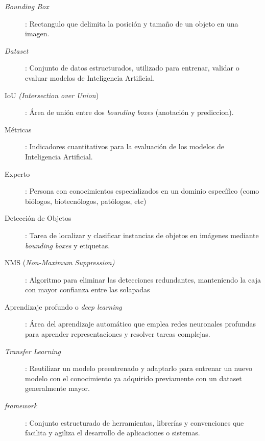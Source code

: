 \documentclass[12pt,a4paper,onecolumn,oneside]{report}
\begin{document}
\begin{description}
  \item[\textit{Bounding Box}]: Rectangulo que delimita la posición y tamaño de un objeto en una imagen.
  \item[\textit{Dataset}]: Conjunto de datos estructurados, utilizado para entrenar, validar o evaluar modelos de Inteligencia Artificial.
  \item[IoU \textit{(Intersection over Union})]: Área de unión entre dos \textit{bounding boxes} (anotación y prediccion).
  \item[Métricas]: Indicadores cuantitativos para la evaluación de los modelos de Inteligencia Artificial.
  \item[Experto]: Persona con conocimientos especializados en un dominio específico (como biólogos, biotecnólogos, patólogos, etc)
  \item[Detección de Objetos]: Tarea de localizar y clasificar instancias de objetos en imágenes mediante \textit{bounding boxes} y etiquetas.
  \item[NMS (\textit{Non-Maximum Suppression)}]: Algoritmo para eliminar las detecciones redundantes, manteniendo la caja con mayor confianza entre las solapadas
  \item[Aprendizaje profundo o \textit{deep learning}]: Área del aprendizaje automático que emplea redes neuronales profundas para aprender representaciones y resolver tareas complejas.
  \item[\textit{Transfer Learning}]: Reutilizar un modelo preentrenado y adaptarlo para entrenar un nuevo modelo con el conocimiento ya adquirido previamente con un dataset generalmente mayor.
  \item[\textit{framework}]: Conjunto estructurado de herramientas, librerías y convenciones que facilita y agiliza el desarrollo de aplicaciones o sistemas.

\end{description}
\end{document}
